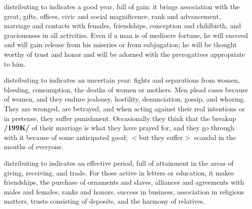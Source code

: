 \Venus\xspace distributing to \Jupiter\xspace indicates a good year, full of gain: it brings association with the great,
gifts, offices, civic and social magnificence, rank and advancement, marriage and contacts with females, friendships, conception and childbirth, and graciousness in all activities. Even if a man is of mediocre fortune, he will succeed and will gain release from his miseries or from subjugation; he will be thought worthy of trust and honor and will be adorned with the prerogatives appropriate to him.

\Venus\xspace distributing to \Mars\xspace indicates an uncertain year: fights and separations from women, bleeding,
consumption, the deaths of women or mothers. Men plead cases because of women, and they endure jealousy, hostility, denunciation, gossip, and whoring. They are wronged, are betrayed, and when acting against their real intentions or in pretense, they suffer punishment. Occasionally they think that the breakup \textbf{/199K/} of their marriage is what they have prayed for, and they go through with it because of some
anticipated good; $<$but they suffer$>$ scandal in the mouths of everyone.

\Venus\xspace distributing to \Mercury\xspace indicates an effective period, full of attainment in the areas of giving,
receiving, and trade. For those active in letters or education, it makes friendships, the purchase of ornaments and slaves, alliances and agreements with males and females, ranks and honors, success in business, association in religious matters, trusts consisting of deposits, and the harmony of relatives.

\newpage